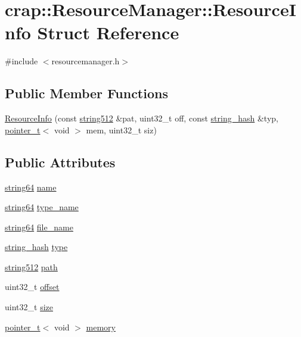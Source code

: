 \hypertarget{structcrap_1_1_resource_manager_1_1_resource_info}{\section{crap\+:\+:Resource\+Manager\+:\+:Resource\+Info Struct Reference}
\label{structcrap_1_1_resource_manager_1_1_resource_info}
}


{\ttfamily \#include $<$resourcemanager.\+h$>$}

\subsection*{Public Member Functions}
\begin{DoxyCompactItemize}
\item 
\hyperlink{structcrap_1_1_resource_manager_1_1_resource_info_a1f9ced1a8923c0a3a38fc6dd077000b1}{Resource\+Info} (const \hyperlink{namespacecrap_a52392ad28972b8b96725b2f7928d38fa}{string512} \&pat, uint32\+\_\+t off, const \hyperlink{classcrap_1_1string__hash}{string\+\_\+hash} \&typ, \hyperlink{structcrap_1_1pointer__t}{pointer\+\_\+t}$<$ void $>$ mem, uint32\+\_\+t siz)
\end{DoxyCompactItemize}
\subsection*{Public Attributes}
\begin{DoxyCompactItemize}
\item 
\hyperlink{namespacecrap_a2b8a7358804e1a9c3c32f12d8cdcfdf8}{string64} \hyperlink{structcrap_1_1_resource_manager_1_1_resource_info_a98faef0a51ed7c88122b97715f94dabb}{name}
\item 
\hyperlink{namespacecrap_a2b8a7358804e1a9c3c32f12d8cdcfdf8}{string64} \hyperlink{structcrap_1_1_resource_manager_1_1_resource_info_abd763473d907b5232dd360092e754f00}{type\+\_\+name}
\item 
\hyperlink{namespacecrap_a2b8a7358804e1a9c3c32f12d8cdcfdf8}{string64} \hyperlink{structcrap_1_1_resource_manager_1_1_resource_info_a7941ed473ffdb4d9be7b024c4213651c}{file\+\_\+name}
\item 
\hyperlink{classcrap_1_1string__hash}{string\+\_\+hash} \hyperlink{structcrap_1_1_resource_manager_1_1_resource_info_a58a31f45846c4603d02693161794bc19}{type}
\item 
\hyperlink{namespacecrap_a52392ad28972b8b96725b2f7928d38fa}{string512} \hyperlink{structcrap_1_1_resource_manager_1_1_resource_info_ac41445b7681c33121a5af5156bebdc8f}{path}
\item 
uint32\+\_\+t \hyperlink{structcrap_1_1_resource_manager_1_1_resource_info_ad2c655eaf108741d772e0905dc0daa6b}{offset}
\item 
uint32\+\_\+t \hyperlink{structcrap_1_1_resource_manager_1_1_resource_info_a6f6d3295854ec9c59bb39ad39764c7d8}{size}
\item 
\hyperlink{structcrap_1_1pointer__t}{pointer\+\_\+t}$<$ void $>$ \hyperlink{structcrap_1_1_resource_manager_1_1_resource_info_a854be7aa2133e5f0163068358fc8dce6}{memory}
\end{DoxyCompactItemize}


